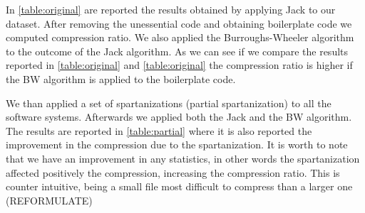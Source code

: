 In \cref{table:original} are reported the results obtained by applying Jack to
our dataset. After removing the unessential code and obtaining boilerplate
code we computed compression ratio. We also applied the Burroughs-Wheeler
algorithm to the outcome of the Jack algorithm. As we can see if we compare
the results reported in \cref{table:original} and \cref{table:original} the
compression ratio is higher if the BW algorithm is applied to the boilerplate
code.

\begin{table}
  \label{table:original}
  \caption{The results of the compression using the Jack algorithm alone and both Jack and
  Burroughs-Wheeler algorithms combined}
  \centering
\end{table}

We than applied a set of spartanizations (partial spartanization) to all the
software systems. Afterwards we applied both the Jack and the BW algorithm.
The results are reported in \cref{table:partial} where it is also
reported the improvement in the compression due to the spartanization. It is
worth to note that we have an improvement in any statistics, in other words the
spartanization affected positively the compression, increasing the compression
ratio. This is counter intuitive, being a small file most difficult to
compress than a larger one (REFORMULATE)

\begin{table}
  \label{table:partial}
  \caption{The results after performing a partial spartanization of the code, compared
  with the compression ratios obtained with the Jack and Burroughs-Wheeler algorithm}
  \centering
\end{table}

